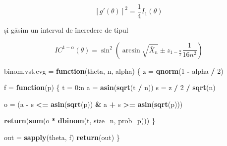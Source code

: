 \documentclass[]{article}
\newenvironment{Shaded}{\begin{snugshade}}{\end{snugshade}}
\newcommand{\KeywordTok}[1]{\textcolor[rgb]{0.13,0.29,0.53}{\textbf{#1}}}
\newcommand{\DataTypeTok}[1]{\textcolor[rgb]{0.13,0.29,0.53}{#1}}
\newcommand{\DecValTok}[1]{\textcolor[rgb]{0.00,0.00,0.81}{#1}}
\newcommand{\StringTok}[1]{\textcolor[rgb]{0.31,0.60,0.02}{#1}}
\newcommand{\ControlFlowTok}[1]{\textcolor[rgb]{0.13,0.29,0.53}{\textbf{#1}}}
\newcommand{\OperatorTok}[1]{\textcolor[rgb]{0.81,0.36,0.00}{\textbf{#1}}}
\newcommand{\NormalTok}[1]{#1}
\begin{document}
\[
\left[g'(\theta)\right]^{2} = \frac{1}{4} I_1(\theta)
\]

și găsim un interval de încredere de tipul

\[
  IC^{1-\alpha}(\theta) = \sin^2\left(\arcsin{\sqrt{\bar{X}_n}} \pm z_{1-\frac{\alpha}{2}}\frac{1}{16n^2}\right)
\]

\begin{Shaded}
\begin{Highlighting}[]
\NormalTok{binom.vst.cvg =}\StringTok{ }\ControlFlowTok{function}\NormalTok{(theta, n, alpha) \{}
\NormalTok{  z =}\StringTok{ }\KeywordTok{qnorm}\NormalTok{(}\DecValTok{1} \OperatorTok{-}\StringTok{ }\NormalTok{alpha }\OperatorTok{/}\StringTok{ }\DecValTok{2}\NormalTok{)}
  
\NormalTok{  f =}\StringTok{ }\ControlFlowTok{function}\NormalTok{(p) \{}
\NormalTok{    t =}\StringTok{ }\DecValTok{0}\OperatorTok{:}\NormalTok{n}
\NormalTok{    a =}\StringTok{ }\KeywordTok{asin}\NormalTok{(}\KeywordTok{sqrt}\NormalTok{(t }\OperatorTok{/}\StringTok{ }\NormalTok{n))}
\NormalTok{    s =}\StringTok{ }\NormalTok{z }\OperatorTok{/}\StringTok{ }\DecValTok{2} \OperatorTok{/}\StringTok{ }\KeywordTok{sqrt}\NormalTok{(n)}
    
\NormalTok{    o =}\StringTok{ }\NormalTok{(a }\OperatorTok{-}\StringTok{ }\NormalTok{s }\OperatorTok{<=}\StringTok{ }\KeywordTok{asin}\NormalTok{(}\KeywordTok{sqrt}\NormalTok{(p)) }\OperatorTok{&}\StringTok{ }\NormalTok{a }\OperatorTok{+}\StringTok{ }\NormalTok{s }\OperatorTok{>=}\StringTok{ }\KeywordTok{asin}\NormalTok{(}\KeywordTok{sqrt}\NormalTok{(p)))}
    
    \KeywordTok{return}\NormalTok{(}\KeywordTok{sum}\NormalTok{(o }\OperatorTok{*}\StringTok{ }\KeywordTok{dbinom}\NormalTok{(t, }\DataTypeTok{size=}\NormalTok{n, }\DataTypeTok{prob=}\NormalTok{p)))}
\NormalTok{  \}}
  
\NormalTok{  out =}\StringTok{ }\KeywordTok{sapply}\NormalTok{(theta, f)}
  \KeywordTok{return}\NormalTok{(out)}
\NormalTok{\}}
\end{Highlighting}
\end{Shaded}
\end{document}
